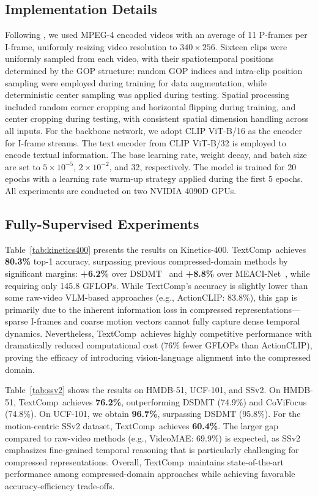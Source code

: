 \documentclass[letterpaper]{article} %
\newcommand{\methodname}{TextComp}
\begin{document}
\subsection{Implementation Details}

Following \cite{wu2018compressed}, we used MPEG-4 encoded videos with an average of 11 P-frames per I-frame, uniformly resizing video resolution to $340 \times 256$. Sixteen clips were uniformly sampled from each video, with their spatiotemporal positions determined by the GOP structure: random GOP indices and intra-clip position sampling were employed during training for data augmentation, while deterministic center sampling was applied during testing. Spatial processing included random corner cropping and horizontal flipping during training, and center cropping during testing, with consistent spatial dimension handling across all inputs. For the backbone network, we adopt CLIP ViT-B/16 as the encoder for I-frame streams. The text encoder from CLIP ViT-B/32 is employed to encode textual information. The base learning rate, weight decay, and batch size are set to $5\times 10^{-5}$, $2\times 10^{-2}$, and 32, respectively. The model is trained for 20 epochs with a learning rate warm-up strategy applied during the first 5 epochs. All experiments are conducted on two NVIDIA 4090D GPUs.



\subsection{Fully-Supervised Experiments}
Table~\ref{tab:kinetics400} presents the results on Kinetics-400. \methodname~achieves \textbf{80.3\%} top-1 accuracy, surpassing previous compressed-domain methods by significant margins: \textbf{+6.2\%} over DSDMT~\cite{DSDMT} and \textbf{+8.8\%} over MEACI-Net~\cite{li2022representation}, while requiring only 145.8 GFLOPs. While \methodname's accuracy is slightly lower than some raw-video VLM-based approaches (e.g., ActionCLIP: 83.8\%), this gap is primarily due to the inherent information loss in compressed representations—sparse I-frames and coarse motion vectors cannot fully capture dense temporal dynamics. Nevertheless, \methodname~achieves highly competitive performance with dramatically reduced computational cost (76\% fewer GFLOPs than ActionCLIP), proving the efficacy of introducing vision-language alignment into the compressed domain.

Table~\ref{tab:ssv2} shows the results on HMDB-51, UCF-101, and SSv2. On HMDB-51, \methodname~achieves \textbf{76.2\%}, outperforming DSDMT (74.9\%) and CoViFocus (74.8\%). On UCF-101, we obtain \textbf{96.7\%}, surpassing DSDMT (95.8\%). For the motion-centric SSv2 dataset, \methodname~achieves \textbf{60.4\%}. The larger gap compared to raw-video methods (e.g., VideoMAE: 69.9\%) is expected, as SSv2 emphasizes fine-grained temporal reasoning that is particularly challenging for compressed representations. Overall, \methodname~maintains state-of-the-art performance among compressed-domain approaches while achieving favorable accuracy-efficiency trade-offs.
\end{document}
